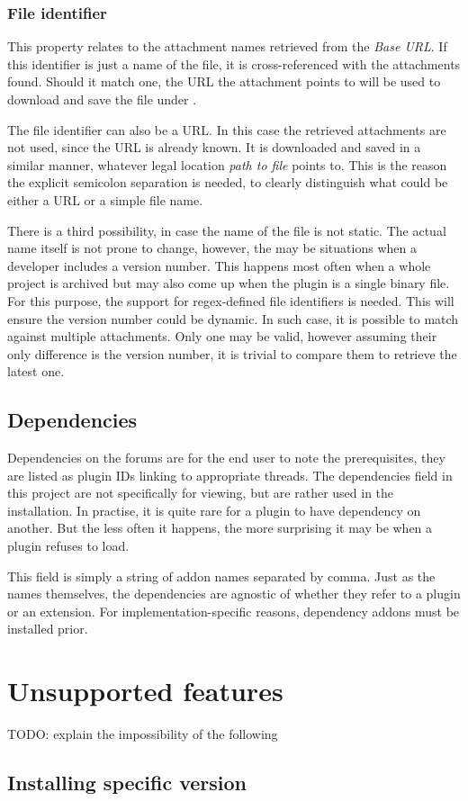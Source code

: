 \subsubsection{File identifier}

This property relates to the attachment names retrieved from the \textit{Base URL}.
If this identifier is just a name of the file, it is cross-referenced with the attachments found.
Should it match one, the URL the attachment points to will be used to download and save the file under .

The file identifier can also be a URL.
In this case the retrieved attachments are not used, since the URL is already known.
It is downloaded and saved in a similar manner, whatever legal location \textit{path to file} points to.
This is the reason the explicit semicolon separation is needed, to clearly distinguish what could be either a URL or a simple file name.

There is a third possibility, in case the name of the file is not static.
The actual name itself is not prone to change, however, the may be situations when a developer includes a version number.
This happens most often when a whole project is archived but may also come up when the plugin is a single binary file.
For this purpose, the support for regex-defined file identifiers is needed.
This will ensure the version number could be dynamic.
In such case, it is possible to match against multiple attachments.
Only one may be valid, however assuming their only difference is the version number, it is trivial to compare them to retrieve the latest one.

\subsection{Dependencies}

Dependencies on the forums are for the end user to note the prerequisites, they are listed as plugin IDs linking to appropriate threads.
The dependencies field in this project are not specifically for viewing, but are rather used in the installation.
In practise, it is quite rare for a plugin to have dependency on another.
But the less often it happens, the more surprising it may be when a plugin refuses to load.

This field is simply a string of addon names separated by comma.
Just as the names themselves, the dependencies are agnostic of whether they refer to a plugin or an extension.
For implementation-specific reasons, dependency addons must be installed prior.

\section{Unsupported features}

TODO: explain the impossibility of the following

\subsection{Installing specific version}
